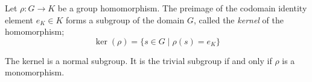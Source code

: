 \documentclass[12pt]{article}
\begin{document}
Let $\rho :G\to K$ be a group homomorphism. The preimage of the
codomain identity element $e_K\in K$ forms a subgroup of the domain
$G$, called the \emph{kernel} of the homomorphism;
$$\operatorname{ker}(\rho)= \{ s \in G\mid\rho   (s)=e_K\} $$

The kernel is a normal subgroup.  It is the trivial subgroup if and
only if $\rho$ is a monomorphism.
\end{document}
